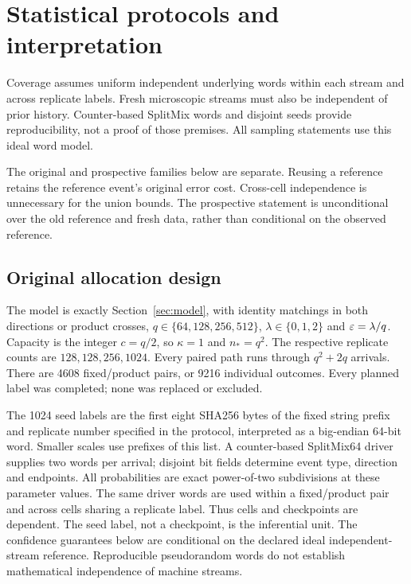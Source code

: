 \section{Statistical protocols and interpretation}\label{app:inference}
Coverage assumes uniform independent underlying words within each stream and across replicate labels. Fresh microscopic streams must also be independent of prior history. Counter-based SplitMix words and disjoint seeds provide reproducibility, not a proof of those premises. All sampling statements use this ideal word model.

The original and prospective families below are separate. Reusing a reference retains the reference event's original error cost. Cross-cell independence is unnecessary for the union bounds. The prospective statement is unconditional over the old reference and fresh data, rather than conditional on the observed reference.

\subsection{Original allocation design}\label{app:original}
The model is exactly Section~\ref*{sec:model}, with identity matchings in both directions or product crosses, $q\in\{64,128,256,512\}$, $\lambda\in\{0,1,2\}$ and $\varepsilon=\lambda/q$. Capacity is the integer $c=q/2$, so $\kappa=1$ and $n_*=q^2$. The respective replicate counts are $128,128,256,1024$. Every paired path runs through $q^2+2q$ arrivals. There are 4608 fixed/product pairs, or 9216 individual outcomes. Every planned label was completed; none was replaced or excluded.

The 1024 seed labels are the first eight SHA256 bytes of the fixed string prefix and replicate number specified in the protocol, interpreted as a big-endian 64-bit word. Smaller scales use prefixes of this list. A counter-based SplitMix64 driver supplies two words per arrival; disjoint bit fields determine event type, direction and endpoints. All probabilities are exact power-of-two subdivisions at these parameter values. The same driver words are used within a fixed/product pair and across cells sharing a replicate label. Thus cells and checkpoints are dependent. The seed label, not a checkpoint, is the inferential unit. The confidence guarantees below are conditional on the declared ideal independent-stream reference. Reproducible pseudorandom words do not establish mathematical independence of machine streams.

